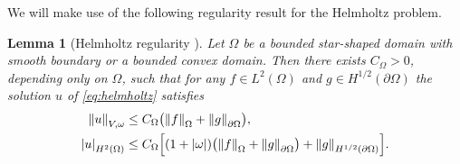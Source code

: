 \documentclass[11pt]{article}
\theoremstyle{definition}
\theoremstyle{plain}
\newtheorem{lemma}[theorem]{Lemma}
\newcommand{\dom}{\Omega}
\newcommand*{\snorm}[1]{\left|#1\right|}
\newcommand*{\norm}[1]{\left\|#1\right\|}
\begin{document}
We will make use of the following regularity result for the Helmholtz problem. 

\begin{lemma}[Helmholtz regularity {\cite[Prop.\ 8.1.4]{MM95}}]\label{lem:regularity}
Let $\Omega$ be a bounded star-shaped domain with smooth boundary or a bounded convex domain.
Then there exists $C_\dom>0$, depending only on $\Omega$, such that for any
$f\in L^2(\Omega)$ and $g\in H^{1/2}(\partial\Omega)$ the solution $u$ of \eqref{eq:helmholtz} satisfies
\begin{subequations}\label{eq:regularity}
\begin{align}
    \norm{u}_{V,\omega} &\leq C_\dom \bigl(\norm{f}_\Omega + \norm{g}_{\partial\Omega}\bigr),\\
    \snorm{u}_{H^2(\Omega)} &\leq C_\dom \Bigl[(1+|\omega|)\bigl(\norm{f}_\Omega + \norm{g}_{\partial\Omega}\bigr)
    +\norm{g}_{H^{1/2}(\partial\Omega)}\Bigr].
\end{align}
\end{subequations}
\end{lemma}
\end{document}
